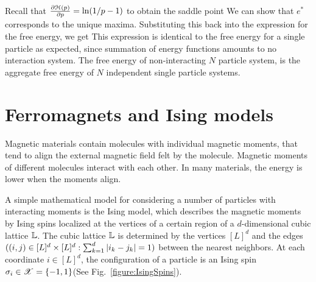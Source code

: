 \documentclass[letterpaper,english,10pt]{article}
\begin{document}
\begin{shaded*}
\begin{exmp}
Recall that $\frac{\partial \mathcal{H}(p) }{\partial p} = \ln(1/p-1)$ to obtain the saddle point
We can show that $e^{\ast}$ corresponds to the unique maxima. %
Substituting this back into the expression for the free energy, we get 
This expression is identical to the free energy for a single particle as expected, 
since summation of energy functions amounts to no interaction system. 
The free energy of non-interacting $N$ particle system, is the aggregate free energy of $N$ independent single particle systems. 
\end{exmp}
\end{shaded*}

\section{Ferromagnets and Ising models}
Magnetic materials contain molecules with individual magnetic moments, that tend to align the external magnetic field felt by the molecule. 
Magnetic moments of different molecules interact with each other. 
In many materials, the energy is lower when the moments align. 

A simple mathematical model for considering a number of particles with interacting moments is the Ising model, which describes the magnetic moments by Ising spins localized at the vertices of a certain region of a $d$-dimensional cubic lattice $\mathbb{L}$. 
The cubic lattice $\mathbb{L}$ is determined by the vertices $[L]^d$ and the edges $((i,j) \in [L]^d \times [L]^d: \sum_{k=1}^d\left\lvert i_k-j_k\right\rvert = 1)$ between the nearest neighbors.  
At each coordinate $i \in [L]^d$, the configuration of a particle is an Ising spin $\sigma_i \in \mathscr{X} = \{-1,1\}$(See Fig.~\ref{figure:IsingSpins}). 
\end{document}

